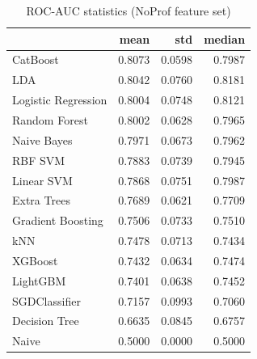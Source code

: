 \begin{table}
\caption{ROC-AUC statistics (NoProf feature set)}
\label{tab:roc-auc_NoProf_stats}
\begin{tabular}{lrrr}
\toprule
 & mean & std & median \\
\midrule
CatBoost & 0.8073 & 0.0598 & 0.7987 \\
LDA & 0.8042 & 0.0760 & 0.8181 \\
Logistic Regression & 0.8004 & 0.0748 & 0.8121 \\
Random Forest & 0.8002 & 0.0628 & 0.7965 \\
Naive Bayes & 0.7971 & 0.0673 & 0.7962 \\
RBF SVM & 0.7883 & 0.0739 & 0.7945 \\
Linear SVM & 0.7868 & 0.0751 & 0.7987 \\
Extra Trees & 0.7689 & 0.0621 & 0.7709 \\
Gradient Boosting & 0.7506 & 0.0733 & 0.7510 \\
kNN & 0.7478 & 0.0713 & 0.7434 \\
XGBoost & 0.7432 & 0.0634 & 0.7474 \\
LightGBM & 0.7401 & 0.0638 & 0.7452 \\
SGDClassifier & 0.7157 & 0.0993 & 0.7060 \\
Decision Tree & 0.6635 & 0.0845 & 0.6757 \\
Naive & 0.5000 & 0.0000 & 0.5000 \\
\bottomrule
\end{tabular}
\end{table}
